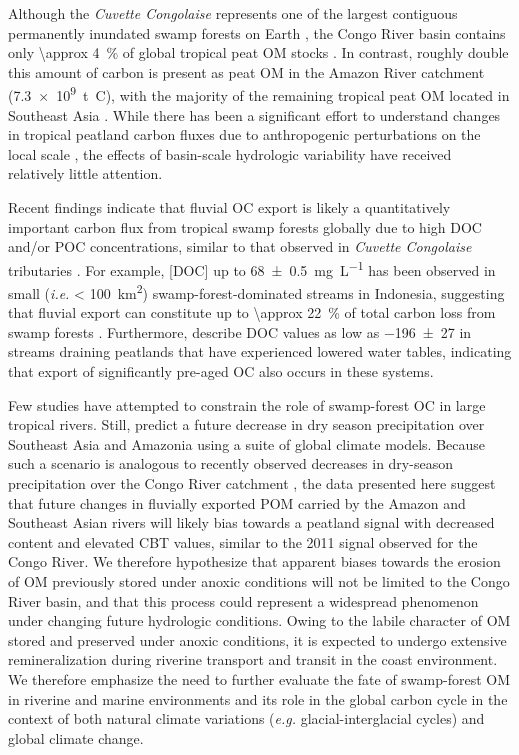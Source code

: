 Although the \textit{Cuvette Congolaise} represents one of the largest contiguous permanently inundated swamp forests on Earth \citep{Keddy:2009cu}, the Congo River basin contains only \SI{\approx 4}{\%} of global tropical peat OM stocks \citep[\textit{i.e.} \SI{3.9e9}{t.C};][]{Page:2011jk}. In contrast, roughly double this amount of carbon is present as peat OM in the Amazon River catchment (\SI{7.3e9}{t.C}), with the majority of the remaining tropical peat OM located in Southeast Asia \citep[\SI{68.5e9}{t.C};][]{Page:2011jk}. While there has been a significant effort to understand changes in tropical peatland carbon fluxes due to anthropogenic perturbations on the local scale \citep[\textit{e.g.}][]{Hooijer:2010ic,Hirano:2012jz,Moore:2013dc}, the effects of basin-scale hydrologic variability have received relatively little attention.

Recent findings indicate that fluvial OC export is likely a quantitatively important carbon flux from tropical swamp forests globally due to high DOC and/or POC concentrations, similar to that observed in \textit{Cuvette Congolaise} tributaries \citep{Mann:2014jx}. For example, [DOC] up to \SI{68 \pm 0.5}{mg.L^{-1}} has been observed in small (\textit{i.e.} \SI{< 100}{km^{2}}) swamp-forest-dominated streams in Indonesia, suggesting that fluvial export can constitute up to \SI{\approx 22}{\%} of total carbon loss from swamp forests \citep{Moore:2013dc}. Furthermore, \citet{Moore:2013dc} describe DOC  values as low as \SI{-196 \pm 27}{\permil} in streams draining peatlands that have experienced lowered water tables, indicating that export of significantly pre-aged OC also occurs in these systems.

Few studies have attempted to constrain the role of swamp-forest OC in large tropical rivers. Still, \citet{Li:2007if} predict a future decrease in dry season precipitation over Southeast Asia and Amazonia using a suite of global climate models. Because such a scenario is analogous to recently observed decreases in dry-season precipitation over the Congo River catchment \citep{Zhou:2014gl}, the data presented here suggest that future changes in fluvially exported POM carried by the Amazon and Southeast Asian rivers will likely bias towards a peatland signal with decreased  content and elevated CBT values, similar to the 2011 signal observed for the Congo River. We therefore hypothesize that apparent biases towards the erosion of OM previously stored under anoxic conditions will not be limited to the Congo River basin, and that this process could represent a widespread phenomenon under changing future hydrologic conditions. Owing to the labile character of OM stored and preserved under anoxic conditions, it is expected to undergo extensive remineralization during riverine transport and transit in the coast environment. We therefore emphasize the need to further evaluate the fate of swamp-forest OM in riverine and marine environments and its role in the global carbon cycle in the context of both natural climate variations (\textit{e.g.} glacial-interglacial cycles) and global climate change.

